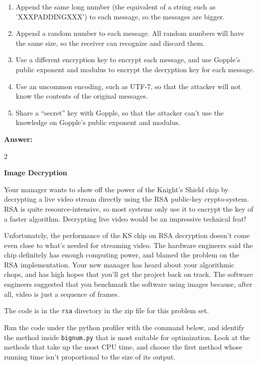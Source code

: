 \documentclass[12pt,twoside]{article}
\newcommand{\answer}{
 \par\medskip
 \textbf{Answer:}
}
\newcommand{\answerIIf}{ \answer
2
}
\begin{document}
\begin{problems}
\begin {problemparts}
\begin{enumerate}
  \item Append the same long number (the equivalent of a string such as
  'XXXPADDINGXXX') to each message, so the messages are bigger.
  \item Append a random number to each message. All random numbers will have the
  same size, so the receiver can recognize and discard them.
  \item Use a different encryption key to encrypt each message, and use Gopple's
  public exponent and modulus to encrypt the decryption key for each message.
  \item Use an uncommon encoding, such as UTF-7, so that the attacker will not
  know the contents of the original messages.
  \item Share a ``secret'' key with Gopple, so that the attacker can't use the
  knowledge on Gopple's public exponent and modulus.
\end{enumerate}
\answerIIf

\end{problemparts}

\newpage

\problem {} \textbf{Image Decryption}

Your manager wants to show off the power of the Knight's Shield chip by
decrypting a live video stream directly using the RSA public-key crypto-system.
RSA is quite resource-intensive, so most systems only use it to encrypt the key
of a faster algorithm. Decrypting live video would be an impressive technical
feat!

Unfortunately, the performance of the KS chip on RSA decryption doesn't come
even close to what's needed for streaming video. The hardware engineers said the
chip definitely has enough computing power, and blamed the problem on the
RSA implementation. Your new manager has heard about your algorithmic chops, and
has high hopes that you'll get the project back on track. The software engineers
suggested that you benchmark the software using images because, after all, video
is just a sequence of frames.

The code is in the \texttt{rsa} directory in the zip file for this problem set.

\begin{problemparts}
\problempart {} Run the code under the python profiler with the command
below, and identify the method inside \texttt{bignum.py} that is most suitable
for optimization. Look at the methods that take up the most CPU time, and
choose the first method whose running time isn't proportional to the size of its
output.


\end{problemparts}
\end{problems}
\end{document}
